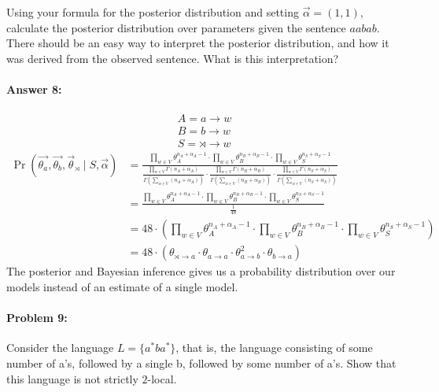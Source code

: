 \documentclass[12pt, letterpaper]{article}
\begin{document}
Using your formula for the posterior distribution and setting
$\vec{\alpha} = (1,1)$, calculate the posterior distribution over
parameters given the sentence $aabab$. There should be an easy way to
interpret the posterior distribution, and how it was derived from the
observed sentence. What is this interpretation?

\paragraph{Answer 8:} \begin{gather*}
    A = a\rightarrow w\\
    B = b \rightarrow w\\
    S = \rtimes \rightarrow w
\end{gather*}\begin{align*}
    \Pr(\vec{\theta_a}, \vec{\theta_b}, \vec{\theta}_{\rtimes} \mid S, \vec{\alpha}) &= \frac{
    \prod_{w \in V} \theta_{A}^{n_A+\alpha_{A}-1}\cdot{
    \prod_{w \in V} \theta_{B}^{n_B+\alpha_{B}-1}\cdot{
    \prod_{w \in V} \theta_{S}^{n_S+\alpha_{S}-1}}}}{
    \frac{\prod_{w \in V} \Gamma(n_A+\alpha_{A})}{\Gamma(\sum_{w \in V} (n_A+\alpha_{A}))}\cdot{
    \frac{\prod_{w \in V} \Gamma(n_B+\alpha_{B})}{\Gamma(\sum_{w \in V} (n_B+\alpha_{B}))}\cdot{
    \frac{\prod_{w \in V} \Gamma(n_S+\alpha_{S})}{\Gamma(\sum_{w \in V} (n_S+\alpha_{S}))}}}}\\
    &=\frac{
    \prod_{w \in V} \theta_{A}^{n_A+\alpha_{A}-1}\cdot{
    \prod_{w \in V} \theta_{B}^{n_B+\alpha_{B}-1}\cdot{
    \prod_{w \in V} \theta_{S}^{n_S+\alpha_{S}-1}}}}{
    \frac{1}{48}}\\
    &= 48 \cdot{\left(\prod_{w \in V} \theta_{A}^{n_A+\alpha_{A}-1}\cdot{
    \prod_{w \in V} \theta_{B}^{n_B+\alpha_{B}-1}\cdot{
    \prod_{w \in V} \theta_{S}^{n_S+\alpha_{S}-1}}}\right)}\\
    &= 48\cdot{(\theta_{\rtimes \rightarrow a}\cdot{\theta_{a \rightarrow a}\cdot{\theta_{a \rightarrow b}^2\cdot{\theta_{b \rightarrow a}}}})}
\end{align*}
The posterior and Bayesian inference gives us a probability distribution over our models instead of an estimate of a single model.

\hrulefill
\paragraph{Problem 9:}

Consider the language $L=\{a^* b a^*\}$, that is, the language
consisting of some number of a's, followed by a single b, followed by
some number of a's. Show that this language is not strictly
$2$-local.\\
\end{document}
